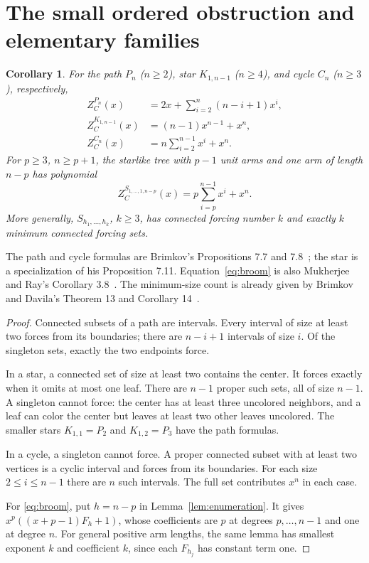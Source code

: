 \documentclass[11pt]{article}
\newtheorem{corollary}[theorem]{Corollary}
\newcommand{\ZC}{Z_C}
\begin{document}
\section{The small ordered obstruction and elementary families}
\begin{corollary}\label{prop:families}
For the path $P_n$ ($n\geq2$), star $K_{1,n-1}$ ($n\geq4$), and
cycle $C_n$ ($n\geq3$), respectively,
\begin{align}
\ZC^{P_n}(x)&=2x+\sum_{i=2}^n(n-i+1)x^i,\label{eq:path}\\
\ZC^{K_{1,n-1}}(x)&=(n-1)x^{n-1}+x^n,\label{eq:star}\\
\ZC^{C_n}(x)&=n\sum_{i=2}^{n-1}x^i+x^n.\label{eq:cycle}
\end{align}
For $p\geq3$, $n\geq p+1$, the starlike tree with $p-1$ unit arms
and one arm of length $n-p$ has polynomial
\begin{equation}
\ZC^{S_{1,\ldots,1,n-p}}(x)=p\sum_{i=p}^{n-1}x^i+x^n.\label{eq:broom}
\end{equation}
More generally, $S_{h_1,\ldots,h_k}$, $k\geq3$, has connected forcing
number $k$ and exactly $k$ minimum connected forcing sets.
\end{corollary}
The path and cycle formulas are Brimkov's Propositions 7.7 and 7.8~\cite{B};
the star is a specialization of his Proposition 7.11.
Equation~\eqref{eq:broom} is also Mukherjee and Ray's Corollary 3.8~\cite{MR}.
The minimum-size count is already given by Brimkov and Davila's
Theorem 13 and Corollary 14~\cite{BD}.
\begin{proof}
Connected subsets of a path are intervals. Every interval of size at least
two forces from its boundaries; there are $n-i+1$ intervals of size $i$.
Of the singleton sets, exactly the two endpoints force.

In a star, a connected set of size at least two contains the center.
It forces exactly when it omits at most one leaf. There are $n-1$ proper
such sets, all of size $n-1$. A singleton cannot force: the center
has at least three uncolored neighbors, and a leaf can color the center
but leaves at least two other leaves uncolored. The smaller stars
$K_{1,1}=P_2$ and $K_{1,2}=P_3$ have the path formulas.

In a cycle, a singleton cannot force. A proper connected subset with at
least two vertices is a cyclic interval and forces from its boundaries.
For each size $2\leq i\leq n-1$ there are $n$ such intervals.
The full set contributes $x^n$ in each case.

For \eqref{eq:broom}, put $h=n-p$ in Lemma~\ref{lem:enumeration}.
It gives $x^p((x+p-1)F_h+1)$, whose coefficients are $p$ at
degrees $p,\ldots,n-1$ and one at degree $n$.
For general positive arm lengths, the same lemma has smallest exponent
$k$ and coefficient $k$, since each $F_{h_j}$ has constant term one.
\end{proof}
\end{document}
